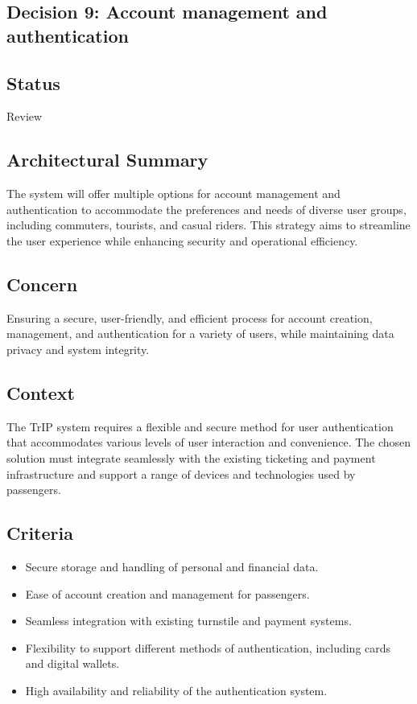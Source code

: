 \subsection{Decision 9: Account management and authentication}

\subsection*{Status}
Review

\subsection*{Architectural Summary}
The system will offer multiple options for account management and authentication to accommodate the preferences and needs of diverse user groups, including commuters, tourists, and casual riders. This strategy aims to streamline the user experience while enhancing security and operational efficiency.

\subsection*{Concern}
Ensuring a secure, user-friendly, and efficient process for account creation, management, and authentication for a variety of users, while maintaining data privacy and system integrity.

\subsection*{Context}
The TrIP system requires a flexible and secure method for user authentication that accommodates various levels of user interaction and convenience. The chosen solution must integrate seamlessly with the existing ticketing and payment infrastructure and support a range of devices and technologies used by passengers.

\subsection*{Criteria}
\begin{itemize}
    \item Secure storage and handling of personal and financial data.
    \item Ease of account creation and management for passengers.
    \item Seamless integration with existing turnstile and payment systems.
    \item Flexibility to support different methods of authentication, including cards and digital wallets.
    \item High availability and reliability of the authentication system.
\end{itemize}

